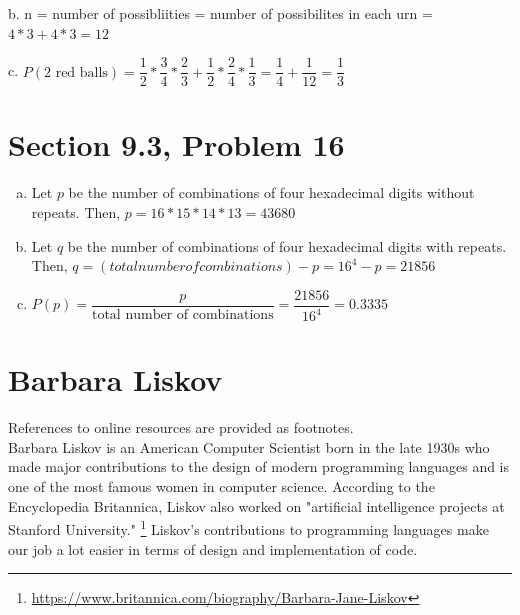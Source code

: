 \documentclass{article}
\begin{document}
b. n = number of possibliities = number of possibilites in each urn = $4*3 + 4*3=12$

c. $P(\text{2 red balls})=\dfrac{1}{2}*\dfrac{3}{4}*\dfrac{2}{3} + \dfrac{1}{2}*\dfrac{2}{4}*\dfrac{1}{3} = \dfrac{1}{4}+ \dfrac{1}{12}=\dfrac{1}{3}$

\clearpage
\header

\section*{Section 9.3, Problem 16}

\begin{enumerate}[a.]
	\item Let $p$ be the number of combinations of four hexadecimal digits without repeats. Then, $p=16*15*14*13=43680$
	\item Let $q$ be the number of combinations of four hexadecimal digits with repeats. Then, $q=(total number of combinations) - p = 16^4 - p = 21856$
	\item $P(p)=\dfrac{p}{\text{total number of combinations}}=\dfrac{21856}{16^4}=0.3335$	
\end{enumerate}

\clearpage
\header

\section*{Barbara Liskov}

References to online resources are provided as footnotes. \\

Barbara Liskov is an American Computer Scientist born in the late 1930s who made major contributions to the design of modern programming languages and is one of the most famous women in computer science. According to the Encyclopedia Britannica, Liskov also worked on "artificial intelligence projects at Stanford University."
\footnote{\url{https://www.britannica.com/biography/Barbara-Jane-Liskov}}
Liskov's contributions to programming languages make our job a lot easier in terms of design and implementation of code.
\end{document}
